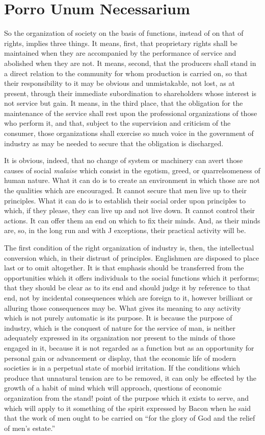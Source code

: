 \documentclass{book}
\begin{document}
\chapter{Porro Unum Necessarium}
\label{chapter-10}
So the organization of society on the basis of functions, instead of on that of rights, implies three things. It means, first, that proprietary rights shall be maintained when they are accompanied by the performance of service and abolished when they are not. It means, second, that the producers shall stand in a direct relation to the community for whom production is carried on, so that their responsibility to it may be obvious and unmistakable, not lost, as at present, through their immediate subordination to shareholders whose interest is not service but gain. It means, in the third place, that the obligation for the maintenance of the service shall rest upon the professional organizations of those who perform it, and that, subject to the supervision and criticism of the consumer, those organizations shall exercise so much voice in the government of industry as may be needed to secure that the obligation is discharged.

It is obvious, indeed, that no change of system or machinery can avert those causes of social \emph{malaise} which consist in the egotism, greed, or quarrelsomeness of human nature. What it can do is to create an environment in which those are not the qualities which are encouraged. It cannot secure that men live up to their principles. What it can do is to establish their social order upon principles to which, if they please, they can live up and not live down. It cannot control their actions. It can offer them an end on which to fix their minds. And, as their minds are, so, in the long run and with J exceptions, their practical activity will be.

The first condition of the right organization of industry is, then, the intellectual conversion which, in their distrust of principles. Englishmen are disposed to place last or to omit altogether. It is that emphasis should be transferred from the opportunities which it offers individuals to the social functions which it performs; that they should be clear as to its end and should judge it by reference to that end, not by incidental consequences which are foreign to it, however brilliant or alluring those consequences may be. What gives its meaning to any activity which is not purely automatic is its purpose. It is because the purpose of industry, which is the conquest of nature for the service of man, is neither adequately expressed in its organization nor present to the minds of those engaged in it, because it is not regarded as a function but as an opportunity for personal gain or advancement or display, that the economic life of modern societies is in a perpetual state of morbid irritation. If the conditions which produce that unnatural tension are to be removed, it can only be effected by the growth of a habit of mind which will approach, questions of economic organization from the stand! point of the purpose which it exists to serve, and which will apply to it something of the spirit expressed by Bacon when he said that the work of men ought to be carried on “for the glory of God and the relief of men’s estate.”
\end{document}
